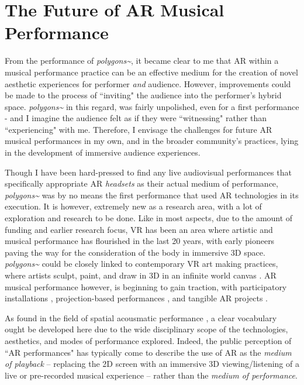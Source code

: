 \section{The Future of AR Musical Performance}
From the performance of \textit{polygons\textasciitilde{}}, it became clear to me that AR within a musical performance practice can be an effective medium for the creation of novel aesthetic experiences for performer \textit{and} audience. However, improvements could be made to the process of ``inviting" the audience into the performer's hybrid space. \textit{polygons\textasciitilde{}} in this regard, was fairly unpolished, even for a first performance - and I imagine the audience felt as if they were ``witnessing" rather than ``experiencing" with me. Therefore, I envisage the challenges for future AR musical performances in my own, and in the broader community's practices, lying in the development of immersive audience experiences.

Though I have been hard-pressed to find any live audiovisual performances that specifically appropriate AR \textit{headsets} as their actual medium of performance, \textit{polygons\textasciitilde{}} was by no means the first performance that used AR technologies in its execution. It is however, extremely new as a research area, with a lot of exploration and research to be done. Like in most aspects, due to the amount of funding and earlier research focus, VR has been an area where artistic and musical performance has flourished in the last 20 years, with early pioneers \citep{davies2004} paving the way for the consideration of the body in immersive 3D space. \textit{polygons\textasciitilde{}} could be closely linked to contemporary VR art making practices, where artists sculpt, paint, and draw in 3D in an infinite world canvas \citep{summers2019}. AR musical performance however, is beginning to gain traction, with participatory installations \citep{chevalier2018},  projection-based performances \citep{quay2016,berthaut2016,robinson2020}, and tangible AR projects \cite{zamborlin2018}. 

As found in the field of spatial acousmatic performance \citep{sharma2015}, a clear vocabulary ought be developed here due to the wide disciplinary scope of the technologies, aesthetics, and modes of performance explored. Indeed, the public perception of ``AR performances" has typically come to describe the use of AR as the \textit{medium of playback} -- replacing the 2D screen with an immersive 3D viewing/listening of a live or pre-recorded musical experience -- rather than the \textit{medium of performance}.

